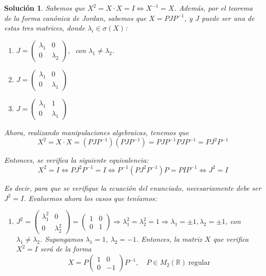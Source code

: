 \documentclass[11pt, a4paper]{article}
\newif\IfInSansMode
\numberwithin{equation}{section}
\newcommand{\R}{\mathbb{R}}
\theoremstyle{theorem-style}
\theoremstyle{definition-style}
\theoremstyle{remark-style}
\newtheorem*{sol}{Solución}
\theoremstyle{example-style}
\newenvironment{nlist}
{\begin{enumerate}
    \renewcommand\labelenumi{(\emph{\roman{enumi})}}}
{\end{enumerate}}
\begin{document}
    \begin{sol} Sabemos que $X^2 = X \cdot X = I \iff X^{-1} = X$. Además, por el \textit{teorema de la forma canónica de Jordan}, sabemos que $X = PJP^{-1}$, y $J$ puede ser una de estas tres matrices, donde $\lambda_i \in \sigma(X)$:
        \begin{nlist}
        \item $J =
            \begin{pmatrix}
                \lambda_1 & 0\\
                0 & \lambda_2
            \end{pmatrix},\ $ con $\lambda_1 \neq \lambda_2$.
        \item  $J =
            \begin{pmatrix}
                \lambda_1 & 0\\
                0 & \lambda_1
            \end{pmatrix}$
        \item  $J =
            \begin{pmatrix}
                \lambda_1 & 1 \\
                0 & \lambda_1
            \end{pmatrix}$
        \end{nlist}

        Ahora, realizando manipulaciones algebraicas, tenemos que
        $$X^2 = X\cdot X = (PJP^{-1})(PJP^{-1}) = PJP^{-1}PJP^{-1} = PJ^2P^{-1}$$

        Entonces, se verifica la siguiente equivalencia: $$X^2 = I \iff PJ^2P^{-1} = I \iff P^{-1}(PJ^2P^{-1})P = P I P^{-1} \iff J^2 = I$$

        Es decir, para que se verifique la ecuación del enunciado, necesariamente debe ser $J^2 = I$. Evaluemos ahora los casos que teníamos:
        \begin{nlist}
        \item $J^2 =
            \begin{pmatrix}
                \lambda_1^2 & 0 \\
                0 & \lambda_2^2
            \end{pmatrix} =
            \begin{pmatrix}
                1 & 0 \\
                0 & 1
            \end{pmatrix} \Rightarrow \lambda_1^2 = \lambda_2^2 = 1 \Rightarrow
            \lambda_1 = \pm 1, \lambda_2 = \pm 1$, con $\lambda_1 \ne \lambda_2$. Supongamos $\lambda_1 = 1,\ \lambda_2 = -1$. Entonces, la matriz $X$ que verifica $X^2 = I$ será de la forma
            $$X = P
            \begin{pmatrix}
                1 &  0\\
                0& -1
            \end{pmatrix}P^{-1},\quad P \in M_2(\R)\ \text{regular}$$


\end{nlist}
\end{sol}
\end{document}
